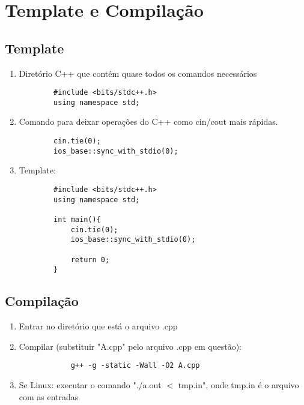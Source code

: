 \section{Template e Compilação}
\subsection{Template}
\begin{enumerate}
    \item Diretório C++ que contém quase todos os comandos necessários
        \begin{verbatim}
        #include <bits/stdc++.h>
        using namespace std;
        \end{verbatim}
    \item Comando para deixar operações do C++ como cin/cout mais rápidas.
        \begin{verbatim}
        cin.tie(0);
        ios_base::sync_with_stdio(0);
        \end{verbatim}
    \item Template:
    \begin{verbatim}
        #include <bits/stdc++.h>
        using namespace std;

        int main(){
            cin.tie(0);
            ios_base::sync_with_stdio(0);

            return 0;
        }
    \end{verbatim}
    
\end{enumerate}

\subsection{Compilação}
    \begin{enumerate}
        \item Entrar no diretório que está o arquivo .cpp
        \item Compilar (substituir "A.cpp" pelo arquivo .cpp em questão): 
        \begin{verbatim}
            g++ -g -static -Wall -O2 A.cpp
        \end{verbatim}
        \item Se Linux: executar o comando "./a.out $<$ tmp.in", onde tmp.in é o arquivo com as entradas\\
    \end{enumerate}
\pagebreak

